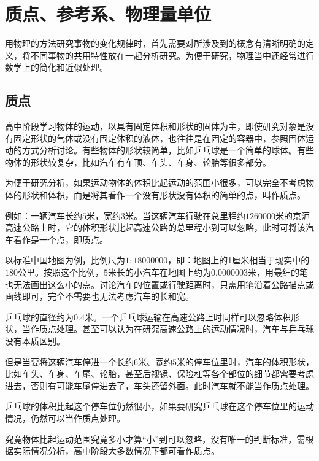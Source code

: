 \documentclass[color=purple]{textbook-cn}%
\begin{document}
\section{质点、参考系、物理量单位}


\begin{Point*}
用物理的方法研究事物的变化规律时，首先需要对所涉及到的概念有清晰明确的定义，将不同事物的共用特性放在一起分析研究。为便于研究，物理当中还经常进行数学上的简化和近似处理。
\end{Point*}

\subsection{质点}
高中阶段学习物体的运动，以具有固定体积和形状的固体为主，即使研究对象是没有固定形状的气体或没有固定体积的液体，也往往是在固定的容器中，参照固体运动的方式分析讨论。有些物体的形状较简单，比如乒乓球是一个简单的球体。有些物体的形状较复杂，比如汽车有车顶、车头、车身、轮胎等很多部分。


\begin{Definition*}[质点]
为便于研究分析，如果运动物体的体积比起运动的范围小很多，可以完全不考虑物体的形状和体积，而是将其看作一个没有形状没有体积的简单的点，叫作\textsf{质点}。
\end{Definition*}


例如：一辆汽车长约$5$米，宽约$3$米。当这辆汽车行驶在总里程约$1260000$米的京沪高速公路上时，它的体积形状比起高速公路的总里程小到可以忽略，此时可将该汽车看作是一个点，即质点。


以标准中国地图为例，比例尺为$1:18000000$，即：地图上的1厘米相当于现实中的$180$公里。按照这个比例，$5$米长的小汽车在地图上约为$0.0000003$米，用最细的笔也无法画出这么小的点。讨论汽车的位置或行驶距离时，只需用笔沿着公路描点或画线即可，完全不需要也无法考虑汽车的长和宽。


乒乓球的直径约为$0.4$米。一个乒乓球运输在高速公路上时同样可以忽略体积形状，当作质点处理。甚至可以认为在研究高速公路上的运动情况时，汽车与乒乓球没有本质区别。


但是当要将这辆汽车停进一个长约$6$米、宽约$5$米的停车位里时，汽车的体积形状，比如车头、车身、车尾、轮胎，甚至后视镜、保险杠等各个部位的细节都需要考虑进去，否则有可能车尾停进去了，车头还留外面。此时汽车就不能当作质点处理。


乒乓球的体积比起这个停车位仍然很小，如果要研究乒乓球在这个停车位里的运动情况，仍然可以当作质点处理。


究竟物体比起运动范围究竟多小才算“小”到可以忽略，没有唯一的判断标准，需根据实际情况分析，高中阶段大多数情况下都可看作质点。
\end{document}
